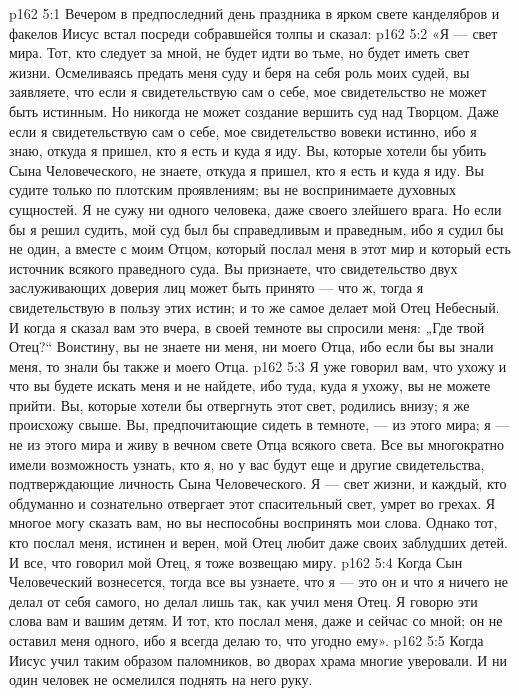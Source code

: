 \vs p162 5:1 Вечером в предпоследний день праздника в ярком свете канделябров и факелов Иисус встал посреди собравшейся толпы и сказал:
\vs p162 5:2 \pc «Я --- свет мира. Тот, кто следует за мной, не будет идти во тьме, но будет иметь свет жизни. Осмеливаясь предать меня суду и беря на себя роль моих судей, вы заявляете, что если я свидетельствую сам о себе, мое свидетельство не может быть истинным. Но никогда не может создание вершить суд над Творцом. Даже если я свидетельствую сам о себе, мое свидетельство вовеки истинно, ибо я знаю, откуда я пришел, кто я есть и куда я иду. Вы, которые хотели бы убить Сына Человеческого, не знаете, откуда я пришел, кто я есть и куда я иду. Вы судите только по плотским проявлениям; вы не воспринимаете духовных сущностей. Я не сужу ни одного человека, даже своего злейшего врага. Но если бы я решил судить, мой суд был бы справедливым и праведным, ибо я судил бы не один, а вместе с моим Отцом, который послал меня в этот мир и который есть источник всякого праведного суда. Вы признаете, что свидетельство двух заслуживающих доверия лиц может быть принято --- что ж, тогда я свидетельствую в пользу этих истин; и то же самое делает мой Отец Небесный. И когда я сказал вам это вчера, в своей темноте вы спросили меня: „Где твой Отец?“ Воистину, вы не знаете ни меня, ни моего Отца, ибо если бы вы знали меня, то знали бы также и моего Отца.
\vs p162 5:3 Я уже говорил вам, что ухожу и что вы будете искать меня и не найдете, ибо туда, куда я ухожу, вы не можете прийти. Вы, которые хотели бы отвергнуть этот свет, родились внизу; я же происхожу свыше. Вы, предпочитающие сидеть в темноте, --- из этого мира; я --- не из этого мира и живу в вечном свете Отца всякого света. Все вы многократно имели возможность узнать, кто я, но у вас будут еще и другие свидетельства, подтверждающие личность Сына Человеческого. Я --- свет жизни, и каждый, кто обдуманно и сознательно отвергает этот спасительный свет, умрет во грехах. Я многое могу сказать вам, но вы неспособны воспринять мои слова. Однако тот, кто послал меня, истинен и верен, мой Отец любит даже своих заблудших детей. И все, что говорил мой Отец, я тоже возвещаю миру.
\vs p162 5:4 Когда Сын Человеческий вознесется, тогда все вы узнаете, что я --- это он и что я ничего не делал от себя самого, но делал лишь так, как учил меня Отец. Я говорю эти слова вам и вашим детям. И тот, кто послал меня, даже и сейчас со мной; он не оставил меня одного, ибо я всегда делаю то, что угодно ему».
\vs p162 5:5 \pc Когда Иисус учил таким образом паломников, во дворах храма многие уверовали. И ни один человек не осмелился поднять на него руку.
